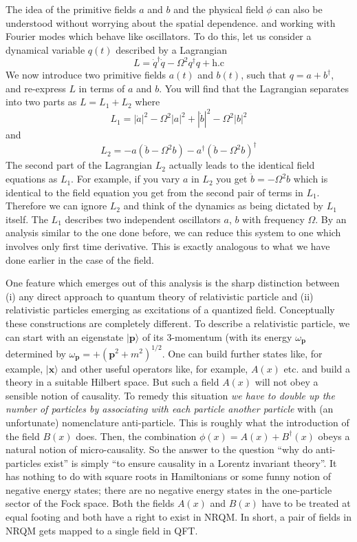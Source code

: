 \documentclass[12pt]{article}
\def\ket#1{|#1\rangle}                    %
\begin{document}
 The idea of the primitive fields $a$ and $b$ and the physical field $\phi$ can also be understood  without worrying about the spatial dependence. and working with Fourier modes which behave like oscillators. To do this, let us consider a dynamical variable $q(t)$ described by a Lagrangian
\begin{equation}
 L = \dot q^\dagger \dot q - \Omega^2 q^\dagger q + \text{h.c}
\end{equation} 
 We now introduce two primitive fields $a(t)$ and $b(t)$, such that $ q = a+b^\dagger$,
  and re-express $L$ in terms of $a$ and $b$.  You will find that the Lagrangian separates into two parts as $L=L_1+L_2$ where
  \begin{equation}
   L_1=|\dot a|^2 - \Omega^2 |a|^2+|\dot b|^2 - \Omega^2 |b|^2
  \end{equation} 
  and 
  \begin{equation}
   L_2=- a (\ddot b - \Omega^2 b) - a^\dagger (\ddot b - \Omega^2 b)^\dagger
  \end{equation} 
  The second part of the Lagrangian $L_2$ actually leads to the identical field equations as $L_1$. For example, if you vary $a$ in $L_2$ you get $\ddot b = -\Omega^2 b$ which is identical to the field equation you get from the second pair of terms in $L_1$. Therefore we can ignore $L_2$ and think of the dynamics as being dictated by $L_1$ itself. The $L_1$ describes two independent oscillators $a$, $b$ with frequency $\Omega$. By an analysis similar to the one done before, we can reduce this system to one which involves only first time derivative. This is exactly analogous to what we have done earlier in the case of the field.   

  
One feature which emerges out of this analysis is the sharp distinction between (i) any direct approach to quantum theory of relativistic particle  and (ii) relativistic particles emerging as excitations of a quantized field. Conceptually these constructions are completely different. To describe a relativistic particle, we can start with an eigenstate $\ket{\bm{p}}$ of its 3-momentum (with its energy $\omega_{\bm{p}}$  determined by $\omega_{\bm{p}} = + (\bm{p}^2 + m^2)^{1/2}$. One can build further states like, for example, $\ket{\bm{x}}$ and other useful operators like, for example, $A(x)$ etc. and build a theory in a suitable Hilbert space. But such a field $A(x)$ will not obey a sensible notion of causality. To remedy this situation \textit{we have to double up the number of particles by associating with each particle another particle} with (an unfortunate) nomenclature anti-particle. This is roughly what the introduction of the field $B(x)$ does. Then, the combination $\phi(x) = A(x) + B^\dagger(x)$ obeys a natural notion of micro-causality.  So the answer to the question ``why do anti-particles exist'' is simply ``to ensure causality in a Lorentz invariant theory''. It has nothing to do with square roots in Hamiltonians  or some funny notion of negative energy states; there are no negative energy states in the one-particle sector of the Fock space. Both the fields $A(x)$ and $B(x)$ have to be treated at equal footing and both have a  right to exist in NRQM. In short, a pair of fields in NRQM gets mapped to a single field in QFT.    
\end{document}
